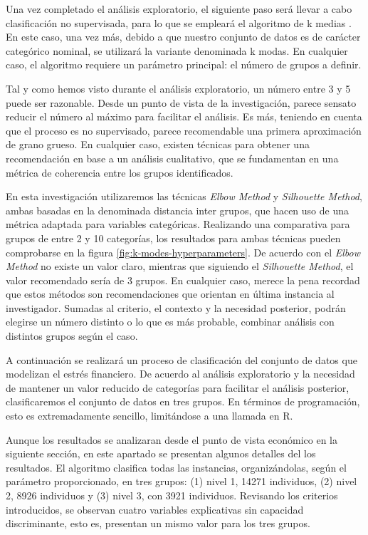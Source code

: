 \documentclass[a4paper, 11pt]{article}
\begin{document}
Una vez completado el análisis exploratorio, el siguiente paso será llevar a cabo 
clasificación no supervisada, para lo que se empleará el algoritmo de k medias
\cite{Hastie23}. En este caso, una vez más, debido a que nuestro conjunto
de datos es de carácter categórico nominal, se utilizará la variante denominada
k modas. En cualquier caso, el algoritmo requiere un parámetro principal: el número
de grupos a definir. 

Tal y como hemos visto durante el análisis exploratorio, un número entre 3 y 5 puede ser
razonable. Desde un punto de vista de la investigación, parece sensato reducir el número
al máximo para facilitar el análisis. Es más, teniendo en cuenta que el proceso es no
supervisado, parece recomendable una primera aproximación de grano grueso. En cualquier
caso, existen técnicas para obtener una recomendación en base a un análisis cualitativo,
que se fundamentan en una métrica de coherencia entre los grupos identificados. 

En esta investigación utilizaremos las técnicas \textit{Elbow Method} y \textit{Silhouette Method},
ambas basadas en la denominada distancia inter grupos, que hacen uso de una métrica adaptada 
para variables categóricas. Realizando una comparativa para grupos de entre 2 y 10 categorías, 
los resultados para ambas técnicas pueden comprobarse en la figura \ref{fig:k-modes-hyperparameters}. De acuerdo con el \textit{Elbow Method} no existe un valor claro,
mientras que siguiendo el \textit{Silhouette Method}, el valor recomendado sería de 3 grupos.
En cualquier caso, merece la pena recordad que estos métodos son recomendaciones que 
orientan en última instancia al investigador. Sumadas al criterio, el contexto y la necesidad
posterior, podrán elegirse un número distinto o lo que es más probable, combinar análisis
con distintos grupos según el caso.

A continuación se realizará un proceso de clasificación del conjunto de datos que modelizan
el estrés financiero. De acuerdo al análisis exploratorio y la necesidad de mantener un
valor reducido de categorías para facilitar el análisis posterior, clasificaremos el 
conjunto de datos en tres grupos. En términos de programación, esto es extremadamente
sencillo, limitándose a una llamada en R.

Aunque los resultados se analizaran desde el punto de vista económico en la siguiente sección,
en este apartado se presentan algunos detalles del los resultados. El algoritmo clasifica
todas las instancias, organizándolas, según el parámetro proporcionado, en tres grupos:
(1) nivel 1, 14271 individuos, (2) nivel 2, 8926 individuos y (3) nivel 3, con 3921 
individuos. Revisando los criterios introducidos, se observan cuatro variables explicativas
sin capacidad discriminante, esto es, presentan un mismo valor para los tres grupos. 
\end{document}
